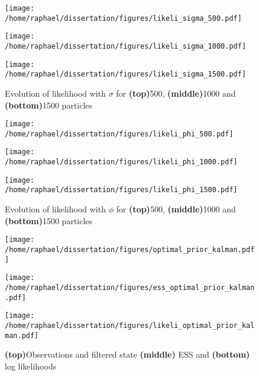 \documentclass{article}
\begin{document}
		\begin{figure}[htb]
			\centering
			\begin{minipage}{0.6\textwidth}
				\centering
				\texttt{[image: /home/raphael/dissertation/figures/likeli\_sigma\_500.pdf]}
			\end{minipage}
			\begin{minipage}{0.6\textwidth}
				\centering
				\texttt{[image: /home/raphael/dissertation/figures/likeli\_sigma\_1000.pdf]}
			\end{minipage}
			\begin{minipage}{0.6\textwidth}
				\centering
				\texttt{[image: /home/raphael/dissertation/figures/likeli\_sigma\_1500.pdf]}
			\end{minipage}
			\caption{Evolution of likelihood with $\sigma$ for \textbf{(top)}500, \textbf{(middle)}1000 and \textbf{(bottom)}1500 particles}
			\label{fig:sigma}
		\end{figure}

		
		\begin{figure}[htb]
			\centering
			\begin{minipage}{0.6\textwidth}
				\centering
				\texttt{[image: /home/raphael/dissertation/figures/likeli\_phi\_500.pdf]}
			\end{minipage}
			\begin{minipage}{0.6\textwidth}
				\centering
				\texttt{[image: /home/raphael/dissertation/figures/likeli\_phi\_1000.pdf]}
			\end{minipage}
			\begin{minipage}{0.6\textwidth}
				\centering
				\texttt{[image: /home/raphael/dissertation/figures/likeli\_phi\_1500.pdf]}
			\end{minipage}
			\caption{Evolution of likelihood with $\phi$ for \textbf{(top)}500, \textbf{(middle)}1000 and \textbf{(bottom)}1500 particles}
			\label{fig:phikal}
		\end{figure}

\fi
		\begin{figure}[htb]
			\centering
			\begin{minipage}{0.6\textwidth}
				\centering
				\texttt{[image: /home/raphael/dissertation/figures/optimal\_prior\_kalman.pdf]}
			\end{minipage}
			\begin{minipage}{0.6\textwidth}
				\centering
				\texttt{[image: /home/raphael/dissertation/figures/ess\_optimal\_prior\_kalman.pdf]}
			\end{minipage}
			\begin{minipage}{0.6\textwidth}
				\centering
				\texttt{[image: /home/raphael/dissertation/figures/likeli\_optimal\_prior\_kalman.pdf]}
			\end{minipage}
			\caption{\textbf{(top)}Observations and filtered state \textbf{(middle)} ESS and \textbf{(bottom)} log likelihoods}
			\label{fig:kalman}
		\end{figure}
\end{document}
